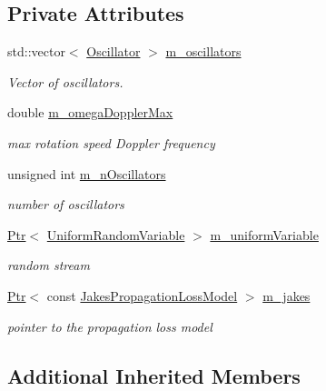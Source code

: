 \subsection*{Private Attributes}
\begin{DoxyCompactItemize}
\item 
std\+::vector$<$ \hyperlink{structns3_1_1JakesProcess_1_1Oscillator}{Oscillator} $>$ \hyperlink{classns3_1_1JakesProcess_a755674c3009ba93c4a1c0ca064911e75}{m\+\_\+oscillators}
\begin{DoxyCompactList}\small\item\em Vector of oscillators. \end{DoxyCompactList}\item 
double \hyperlink{classns3_1_1JakesProcess_ac9e2529b40af28efc63d75c981617594}{m\+\_\+omega\+Doppler\+Max}
\begin{DoxyCompactList}\small\item\em max rotation speed Doppler frequency \end{DoxyCompactList}\item 
unsigned int \hyperlink{classns3_1_1JakesProcess_a356927b16370f2b694f61775adbb1c4b}{m\+\_\+n\+Oscillators}
\begin{DoxyCompactList}\small\item\em number of oscillators \end{DoxyCompactList}\item 
\hyperlink{classns3_1_1Ptr}{Ptr}$<$ \hyperlink{classns3_1_1UniformRandomVariable}{Uniform\+Random\+Variable} $>$ \hyperlink{classns3_1_1JakesProcess_a2bada1f27e9f1b924b5b0b5da0363f5d}{m\+\_\+uniform\+Variable}
\begin{DoxyCompactList}\small\item\em random stream \end{DoxyCompactList}\item 
\hyperlink{classns3_1_1Ptr}{Ptr}$<$ const \hyperlink{classns3_1_1JakesPropagationLossModel}{Jakes\+Propagation\+Loss\+Model} $>$ \hyperlink{classns3_1_1JakesProcess_aec08be974a3d3428286077332e09957e}{m\+\_\+jakes}
\begin{DoxyCompactList}\small\item\em pointer to the propagation loss model \end{DoxyCompactList}\end{DoxyCompactItemize}
\subsection*{Additional Inherited Members}


